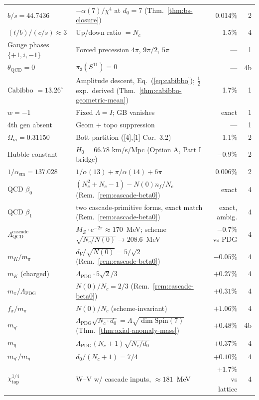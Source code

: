 \documentclass[12pt,a4paper]{article}
\begin{document}
\begin{center}
{\begin{tabular}{llrr}
$b/s = 44.7436$ & $-\alpha(7)/\chi^4$ at $d_0=7$ (Thm.~\ref{thm:bs-closure}) & 0.014\% & 2 \\
$(t/b)/(c/s) \approx 3$ & Up/down ratio $= N_c$ & 1.5\% & 4 \\
Gauge phases $\{+1, i, -1\}$ & Forced precession $4\pi$, $9\pi/2$, $5\pi$ & --- & 1 \\
$\theta_{\text{QCD}} = 0$ & $\pi_3(S^{11}) = 0$ & --- & 4b \\
Cabibbo $= 13.26^\circ$ & Amplitude descent, Eq.~(\ref{eq:cabibbo}); $\tfrac{1}{2}$ exp.\ derived (Thm.~\ref{thm:cabibbo-geometric-mean}) & 1.7\% & 1 \\
$w = -1$ & Fixed $\Lambda = I$; GB vanishes & exact & 1 \\
4th gen absent & Geom + topo suppression & --- & 1 \\
$\Omega_m = 0.31150$ & Bott partition ([4],[1] Cor.\ 3.2) & 1.1\% & 2 \\
Hubble constant & $H_0 = 66.78$ km/s/Mpc (Option A, Part I bridge) & $-0.9\%$ & 2 \\
$1/\alpha_{\text{em}} = 137.028$ & $1/\alpha(13) + \pi/\alpha(14) + 6\pi$ & 0.006\% & 2 \\
QCD $\beta_0$ & $(N_c^2{+}N_c{-}1) - N(0) n_f/N_c$ (Rem.~\ref{rem:cascade-beta0}) & exact & 4 \\
QCD $\beta_1$ & two cascade-primitive forms, exact match (Rem.~\ref{rem:cascade-beta0}) & exact, ambig. & 4 \\
$\Lambda_{\text{QCD}}^{\text{cascade}}$ & $M_Z\cdot e^{-2\pi}\approx 170$~MeV; scheme $\sqrt{N_c/N(0)}\to 208.6$~MeV & $-0.7\%$ vs PDG & 4 \\
$m_K/m_\pi$ & $d_V/\sqrt{N(0)}=5/\sqrt{2}$ (Rem.~\ref{rem:cascade-beta0}) & $-0.05\%$ & 4 \\
$m_K$ (charged) & $\Lambda_{\text{PDG}}\cdot 5\sqrt{2}/3$ & $+0.27\%$ & 4 \\
$m_\pi/\Lambda_{\text{PDG}}$ & $N(0)/N_c = 2/3$ (Rem.~\ref{rem:cascade-beta0}) & $+0.31\%$ & 4 \\
$f_\pi/m_\pi$ & $N(0)/N_c$ (scheme-invariant) & $+1.06\%$ & 4 \\
$m_{\eta'}$ & $\Lambda_{\text{PDG}}\sqrt{N_c\cdot d_0}=\Lambda\sqrt{\dim\mathrm{Spin}(7)}$ (Thm.~\ref{thm:axial-anomaly-mass}) & $+0.48\%$ & 4b \\
$m_\eta$ & $\Lambda_{\text{PDG}}(N_c{+}1)\sqrt{N_c/d_0}$ & $+0.37\%$ & 4 \\
$m_{\eta'}/m_\eta$ & $d_0/(N_c{+}1)=7/4$ & $+0.10\%$ & 4 \\
$\chi_{\text{top}}^{1/4}$ & W--V w/ cascade inputs, $\approx 181$~MeV & $+1.7\%$ vs lattice & 4 \\

\end{tabular}}
\end{center}
\end{document}
